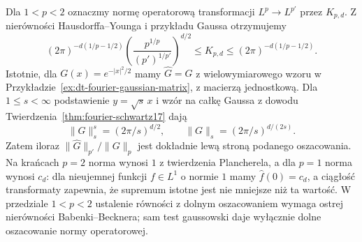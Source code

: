 \begin{przyklad}
\label{ex:dt-hy-gaussian-ratio}
Dla $1<p<2$ oznaczmy normę operatorową transformacji
$L^p\to L^{p'}$ przez $K_{p,d}$. Z nierówności
Hausdorffa--Younga i przykładu Gaussa otrzymujemy
\[
 (2\pi)^{-d(1/p-1/2)}
 \left(\frac{p^{1/p}}{(p')^{1/p'}}\right)^{d/2}
 \le K_{p,d}\le (2\pi)^{-d(1/p-1/2)}.
\]
Istotnie, dla $G(x)=e^{-|x|^2/2}$ mamy
$\widehat G=G$ z wielowymiarowego wzoru w
Przykładzie~\ref{ex:dt-fourier-gaussian-matrix},
z macierzą jednostkową.
Dla $1\le s<\infty$ podstawienie $y=\sqrt{s}\,x$
i wzór na całkę Gaussa z dowodu
Twierdzenia~\ref{thm:fourier-schwartz17} dają
\[
 \|G\|_s^s=(2\pi/s)^{d/2},
 \qquad
 \|G\|_s=(2\pi/s)^{d/(2s)}.
\]
Zatem iloraz $\|\widehat G\|_{p'}/\|G\|_p$
jest dokładnie lewą stroną podanego oszacowania.
Na krańcach $p=2$ norma wynosi $1$ z twierdzenia
Plancherela, a dla $p=1$ norma wynosi $c_d$:
dla nieujemnej funkcji $f\in L^1$ o normie $1$
mamy $\widehat f(0)=c_d$, a ciągłość transformaty
zapewnia, że supremum istotne jest nie mniejsze
niż ta wartość.
W przedziale $1<p<2$ ustalenie równości z dolnym
oszacowaniem wymaga ostrej nierówności
Babenki--Becknera; sam test gaussowski daje wyłącznie
dolne oszacowanie normy operatorowej.
\end{przyklad}

